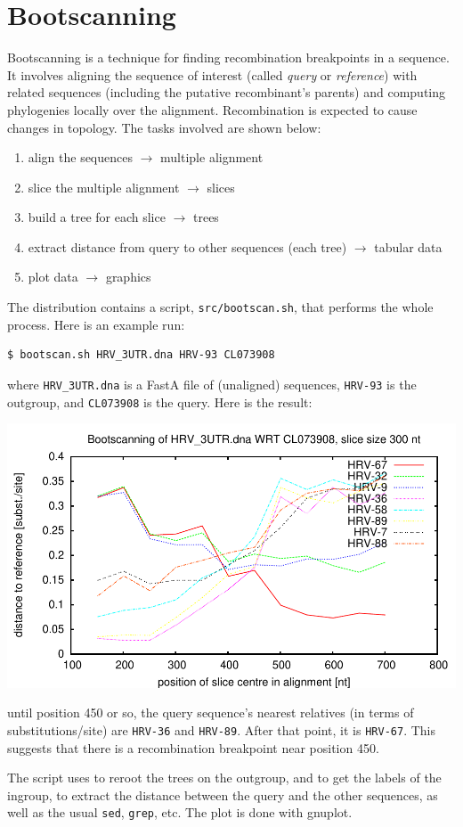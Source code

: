 \section{Bootscanning}
\label{sct_bootscanning}

Bootscanning is a technique for finding recombination breakpoints in a
sequence. It involves aligning the sequence of interest (called \emph{query} or
\emph{reference}) with related sequences (including the putative recombinant's
parents) and computing phylogenies locally over the alignment. Recombination is
expected to cause changes in topology.  The tasks involved are shown below:
\begin{enumerate}
\item align the sequences $\rightarrow$ multiple alignment
\item slice the multiple alignment $\rightarrow$ slices
\item build a tree for each slice $\rightarrow$ trees
\item extract distance from query to other sequences (each tree) $\rightarrow$ tabular data
\item plot data $\rightarrow$ graphics
\end{enumerate}
The distribution contains a script, \texttt{src/bootscan.sh}, that performs the whole process. Here is an example run:
\begin{verbatim}
$ bootscan.sh HRV_3UTR.dna HRV-93 CL073908
\end{verbatim}
where \texttt{HRV\_3UTR.dna} is a FastA file of (unaligned) sequences, \texttt{HRV-93} is the outgroup, and \texttt{CL073908} is the query.  Here is the result:

\begin{centering}
\includegraphics[scale=0.7]{bootscan_1.pdf}
\end{centering}

\smallskip{}
\noindent{}until position 450 or so, the query sequence's nearest relatives (in
terms of substitutions/site) are \texttt{HRV-36} and \texttt{HRV-89}. After
that point, it is \texttt{HRV-67}. This suggests that there is a recombination
breakpoint near position 450.

The script uses \reroot{} to reroot the trees on the outgroup, \clade{} and
 to get the labels of the ingroup, \distance{} to extract the distance
between the query and the other sequences, as well as the usual \texttt{sed}, \texttt{grep}, etc. The plot is done with gnuplot.
